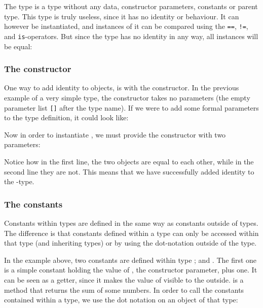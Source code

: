 
The type  is a type without any data, constructor parameters, constants
or parent type. This type is truly useless, since it has no identity or
behaviour. It can however be instantiated, and instances of it can be compared
using the \texttt{==}, \texttt{!=}, and \texttt{is}-operators. But since the
type has no identity in any way, all instances will be equal:


\subsubsection{The constructor}

One way to add identity to objects, is with the constructor. In the previous
example of a very simple type, the constructor takes no parameters (the empty
parameter list \texttt{[]} after the type name). If we were to add some formal
parameters to the type definition, it could look like:


Now in order to instantiate , we must provide the constructor with two
parameters: 


Notice how in the first line, the two objects are equal to each other, while in
the second line they are not. This means that we have successfully added
identity to the -type.

\subsubsection{The constants}

Constants within types are defined in the same way as constants outside of
types. The difference is that constants defined within a type can only be
accessed within that type (and inheriting types) or by using the dot-notation
outside of the type.


In the example above, two constants are defined within type ;
 and . The first one  is a simple
constant holding the value of , the constructor parameter, plus one.
It can be seen as a getter, since it makes the value of  visible to
the outside.  is a method that returns the sum of some
numbers. In order to call the constants contained within a type, we use the dot
notation on an object of that type:

